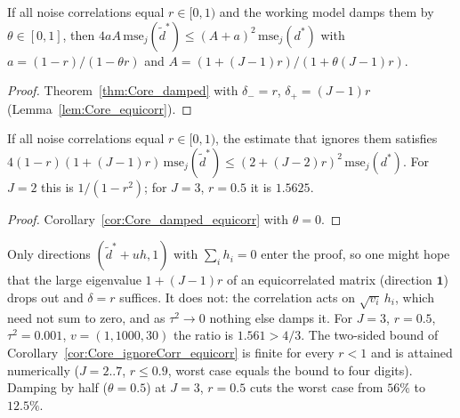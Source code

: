 \begin{corollary}\label{cor:Core_damped_equicorr}
  \leanok
  If all noise correlations equal $r \in [0,1)$ and the working model damps them by
  $\theta \in [0,1]$, then $4aA\,\mathrm{mse}_j(\tilde d^*) \le (A+a)^2\,\mathrm{mse}_j(d^*)$ with
  $a = (1-r)/(1-\theta r)$ and $A = (1+(J-1)r)/(1+\theta(J-1)r)$.
\end{corollary}
\begin{proof}
  \leanok
  Theorem~\ref{thm:Core_damped} with $\delta_- = r$, $\delta_+ = (J-1)r$ (Lemma~\ref{lem:Core_equicorr}).
\end{proof}

\begin{corollary}\label{cor:Core_ignoreCorr_equicorr}
  \leanok
  If all noise correlations equal $r \in [0,1)$, the estimate that ignores them satisfies
  $4(1-r)(1+(J-1)r)\,\mathrm{mse}_j(\tilde d^*) \le (2+(J-2)r)^2\,\mathrm{mse}_j(d^*)$.
  For $J = 2$ this is $1/(1-r^2)$; for $J = 3$, $r = 0.5$ it is $1.5625$.
\end{corollary}
\begin{proof}
  \leanok
  Corollary~\ref{cor:Core_damped_equicorr} with $\theta = 0$.
\end{proof}

\begin{remark}\label{rem:equicorr}
  Only directions $(\tilde d^* + uh, 1)$ with $\sum_i h_i = 0$ enter the proof, so one might
  hope that the large eigenvalue $1 + (J-1)r$ of an equicorrelated matrix (direction $\mathbf 1$)
  drops out and $\delta = r$ suffices. It does not: the correlation acts on $\sqrt{v_i}\,h_i$,
  which need not sum to zero, and as $\tau^2 \to 0$ nothing else damps it. For $J = 3$,
  $r = 0.5$, $\tau^2 = 0.001$, $v = (1, 1000, 30)$ the ratio is $1.561 > 4/3$. The two-sided
  bound of Corollary~\ref{cor:Core_ignoreCorr_equicorr} is finite for every $r < 1$ and is
  attained numerically ($J = 2..7$, $r \le 0.9$, worst case equals the bound to four digits).
  Damping by half ($\theta = 0.5$) at $J = 3$, $r = 0.5$ cuts the worst case from $56\%$ to $12.5\%$.
\end{remark}

